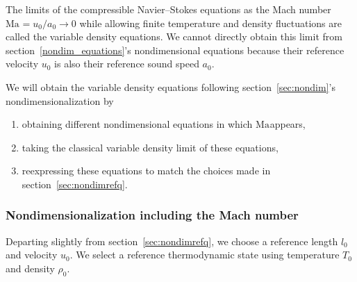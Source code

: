 \documentclass[letterpaper,11pt,nointlimits,reqno]{amsart}
\newcommand{\Mach}[1][]{\ensuremath{\mbox{Ma}_{#1}}}
\begin{document}
The limits of the compressible Navier--Stokes equations as the Mach number
$\Mach = u_{0} / a_{0} \to 0$ while allowing finite temperature and density
fluctuations are called the variable density equations.  We cannot directly
obtain this limit from section~\ref{nondim_equations}'s nondimensional
equations because their reference velocity $u_{0}$ is also their reference
sound speed $a_{0}$.

We will obtain the variable density equations following
section~\ref{sec:nondim}'s nondimensionalization by
\begin{enumerate}
 \item obtaining different nondimensional equations in which \Mach appears,
 \item taking the classical variable density limit of these equations,
 \item reexpressing these equations to match the choices made in
       section~\ref{sec:nondimrefq}.
\end{enumerate}

\subsubsection{Nondimensionalization including the Mach number}

Departing slightly from section~\ref{sec:nondimrefq}, we choose a reference
length $l_{0}$ and velocity $u_{0}$.  We select a reference thermodynamic state
using temperature $T_{0}$ and density $\rho_{0}$.
\end{document}
